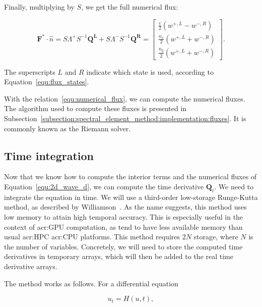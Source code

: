 \noindent
Finally, multiplying by \(S\), we get the full numerical flux:

\begin{equation} \label{equ:numerical_flux}
    \mathbf{F}^* \cdot \widehat{n} = 
    S \Lambda^+ S^{-1} \mathbf{\mathbf{Q}^L} + S \Lambda^- S^{-1} \mathbf{\mathbf{Q}^R} =
    \begin{bmatrix}
        \frac{c}{2} \left( w^{+, L} - w^{-, R} \right) \\
        \frac{n_x}{2} \left( w^{+, L} + w^{-, R} \right) \\
        \frac{n_y}{2} \left( w^{+, L} + w^{-, R} \right)
    \end{bmatrix}.
\end{equation}

\noindent
The superscripts \(L\) and \(R\) indicate which state is used, according to
Equation~\ref{equ:flux_states}. 

With the relation~\ref{equ:numerical_flux}, we can compute the numerical fluxes. The algorithm used
to compute these fluxes is presented in
Subsection~\ref{subsection:spectral_element_method:implementation:fluxes}. It is commonly known as
the Riemann solver.

\subsection{Time integration}\label{subsection:spectral_element_method:dg_sem:time}

Now that we know how to compute the interior terms and the numerical fluxes of
Equation~\ref{equ:2d_wave_d}, we can compute the time derivative \(\mathbf{Q}_t\). We need to
integrate the equation in time. We will use a third-order low-storage Runge-Kutta method, as
described by Williamson~\cite{Williamson1980}. As the name suggests, this method uses low memory to
attain high temporal accuracy. This is especially useful in the context of \acrshort{acr:GPU}
computation, as  tend to have less available memory than usual
\acrshort{acr:HPC} \acrshort{acr:CPU} platforms. This method requires \(2 N\) storage, where \(N\)
is the number of variables. Concretely, we will need to store the computed time derivatives in
temporary arrays, which will then be added to the real time derivative arrays.

The method works as follows. For a differential equation

\begin{equation}
	u_t = H(u, t),
\end{equation}


